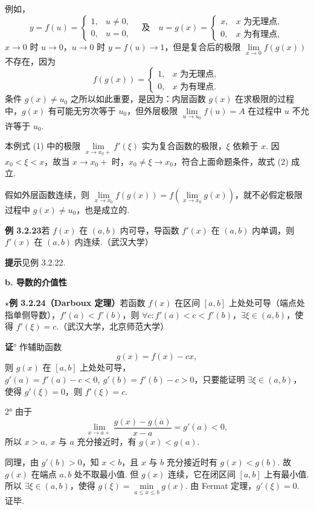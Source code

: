 \documentclass[UTF8, 12pt, fontset=fandol, oneside]{ctexart}
\begin{document}
例如，
\[
y=f(u)=
\begin{cases}
1, & u\ne0,\\
0, & u=0,
\end{cases}
\quad\text{及}\quad
u=g(x)=
\begin{cases}
x, & x\text{ 为无理点},\\
0, & x\text{ 为有理点},
\end{cases}
\]
$x\to0$ 时 $u\to0$，$u\to0$ 时 $y=f(u)\to1$，但是复合后的极限 $\lim\limits_{x\to0}f(g(x))$ 不存在，因为
\[
f(g(x))=
\begin{cases}
1, & x\text{ 为无理点},\\
0, & x\text{ 为有理点}.
\end{cases}
\]
条件 $g(x)\ne u_0$ 之所以如此重要，是因为：内层函数 $g(x)$ 在求极限的过程中，$g(x)$ 有可能无穷次等于 $u_0$，但外层极限 $\lim\limits_{u\to u_0}f(u)=A$ 在过程中 $u$ 不允许等于 $u_0$.

本例式 (1) 中的极限 $\lim\limits_{x\to x_0+}f'(\xi)$ 实为复合函数的极限，$\xi$ 依赖于 $x$. 因 $x_0<\xi<x$，故当 $x\to x_0+$ 时，$x_0\ne\xi\to x_0$，符合上面命题条件，故式 (2) 成立.

假如外层函数连续，则 $\lim\limits_{x\to x_0}f(g(x))=f\left(\lim\limits_{x\to x_0}g(x)\right)$，就不必假定极限过程中 $g(x)\ne u_0$，也是成立的.

\noindent\textbf{例 3.2.23}\quad 若 $f(x)$ 在 $(a,b)$ 内可导，导函数 $f'(x)$ 在 $(a,b)$ 内单调，则 $f'(x)$ 在 $(a,b)$ 内连续.（武汉大学）

\noindent\textbf{提示}\quad 见例 3.2.22.

\noindent\textbf{b. 导数的介值性}

\noindent\textbf{$\star$例 3.2.24（Darboux 定理）}\quad 若函数 $f(x)$ 在区间 $[a,b]$ 上处处可导（端点处指单侧导数），$f'(a)<f'(b)$，则 $\forall c:f'(a)<c<f'(b)$，$\exists\xi\in(a,b)$，使得 $f'(\xi)=c$.（武汉大学，北京师范大学）

\noindent\textbf{证}° 作辅助函数
\[
  g(x)=f(x)-cx,
\]
则 $g(x)$ 在 $[a,b]$ 上处处可导，$g'(a)=f'(a)-c<0,\ g'(b)=f'(b)-c>0$，只要能证明 $\exists\xi\in(a,b)$，使得 $g'(\xi)=0$，则 $f'(\xi)=c$.

2° 由于
\[
  \lim_{x\to a+}\frac{g(x)-g(a)}{x-a}=g'(a)<0,
\]
所以 $x>a,\ x$ 与 $a$ 充分接近时，有 $g(x)<g(a)$.

同理，由 $g'(b)>0$，知 $x<b$，且 $x$ 与 $b$ 充分接近时有 $g(x)<g(b)$.
故 $g(x)$ 在端点 $a,b$ 处不取最小值. 但 $g(x)$ 连续，它在闭区间 $[a,b]$ 上有最小值. 所以 $\exists\xi\in(a,b)$，使得 $g(\xi)=\min\limits_{a\le x\le b}g(x)$. 由 Fermat 定理，$g'(\xi)=0$. 证毕.
\end{document}

